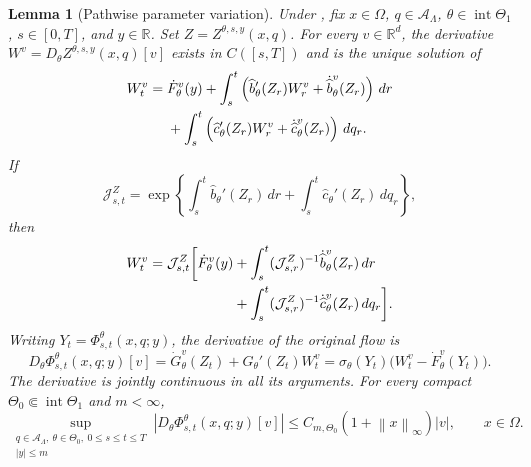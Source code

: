 \documentclass[11pt,reqno]{amsart}
\theoremstyle{plain}
\newtheorem{lemma}[lemma]{Lemma}
\theoremstyle{definition}
\newcommand{\R}{\mathbb R}
\newcommand{\cA}{\mathcal A}
\newcommand{\dd}{\,d}
\newcommand{\norm}[1]{\left\lVert #1\right\rVert}
\newcommand{\abs}[1]{\left\lvert #1\right\rvert}
\begin{document}
\begin{lemma}[Pathwise parameter variation]
\label{lem:parametric-variation}
Under , fix \(x\in\Omega\),
\(q\in\cA_\Lambda\), \(\theta\in\operatorname{int}\Theta_1\),
\(s\in[0,T]\), and \(y\in\R\).
Set \(Z=Z^{\theta,s,y}(x,q)\).  For every \(v\in\R^d\), the derivative
\(W^v=D_\theta Z^{\theta,s,y}(x,q)[v]\) exists in \(C([s,T])\) and is the
unique solution of
\begin{align}
  W_t^v
  ={}&\dot F_\theta^v(y)
  +\int_s^t
    \left(
      \widehat b_\theta'(Z_r)W_r^v
      +\dot{\widehat b}_\theta^v(Z_r)
    \right)\dd r
  \notag\\
  &+\int_s^t
    \left(
      \widehat c_\theta'(Z_r)W_r^v
      +\dot{\widehat c}_\theta^v(Z_r)
    \right)\dd q_r.
  \label{eq:parametric-Lamperti-variation}
\end{align}
If
\[
  \mathcal J^Z_{s,t}
  =\exp\left\{
    \int_s^t\widehat b_\theta'(Z_r)\dd r
    +\int_s^t\widehat c_\theta'(Z_r)\dd q_r
  \right\},
\]
then
\begin{align}
  W_t^v
  =\mathcal J^Z_{s,t}\bigg[
    \dot F_\theta^v(y)
    &+\int_s^t(\mathcal J^Z_{s,r})^{-1}
      \dot{\widehat b}_\theta^v(Z_r)\dd r
    \notag\\
    &+\int_s^t(\mathcal J^Z_{s,r})^{-1}
      \dot{\widehat c}_\theta^v(Z_r)\dd q_r
  \bigg].
  \label{eq:parametric-variation-of-constants}
\end{align}
Writing \(Y_t=\Phi_{s,t}^\theta(x,q;y)\), the derivative of the original
flow is
\begin{equation}\label{eq:parametric-flow-derivative}
  D_\theta\Phi_{s,t}^\theta(x,q;y)[v]
  =\dot G_\theta^v(Z_t)+G_\theta'(Z_t)W_t^v
  =\sigma_\theta(Y_t)\bigl(W_t^v-\dot F_\theta^v(Y_t)\bigr).
\end{equation}
The derivative is jointly continuous in all its arguments.  For every compact
\(\Theta_0\Subset\operatorname{int}\Theta_1\) and \(m<\infty\),
\begin{equation}\label{eq:parametric-pathwise-bound}
  \sup_{\substack{q\in\cA_\Lambda,\ \theta\in\Theta_0,\
  0\le s\le t\le T\\
  |y|\le m}}
  \abs{D_\theta\Phi_{s,t}^\theta(x,q;y)[v]}
  \le C_{m,\Theta_0}(1+\norm{x}_\infty)\abs{v},
  \qquad x\in\Omega.
\end{equation}
\end{lemma}
\end{document}
